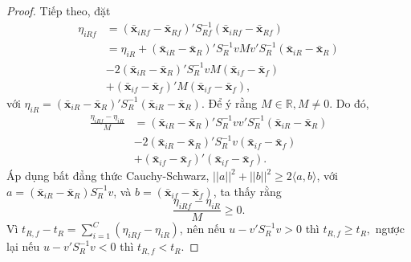 \begin{proof}
	Tiếp theo, đặt
	\begin{align*}
		\eta_{iRf} &= (\bar{\boldsymbol{x}} _{iRf}-\bar{\boldsymbol{x}}_{Rf})'S_{Rf}^{-1}(\bar{\boldsymbol{x}} _{iRf}-\bar{\boldsymbol{x}}_{Rf})\\
		&= \eta_{iR}+(\bar{\boldsymbol{x}}_{iR}-\bar{\boldsymbol{x}}_R)'S_R^{-1}vMv'S_R^{-1}(\bar{\boldsymbol{x}}_{iR}-\bar{\boldsymbol{x}}_R)\\
		& - 2(\bar{\boldsymbol{x}}_{iR}-\bar{\boldsymbol{x}}_R)'S_R^{-1}vM(\bar{\boldsymbol{x}}_{if}-\bar{\boldsymbol{x}}_f)\\
		&+ (\bar{\boldsymbol{x}}_{if}-\bar{\boldsymbol{x}}_f)'M(\bar{\boldsymbol{x}}_{if}-\bar{\boldsymbol{x}}_f),
	\end{align*}
	với  
	$\eta_{iR} = (\bar{\boldsymbol{x}} _{iR}-\bar{\boldsymbol{x}}_{R})'S_{R}^{-1}(\bar{\boldsymbol{x}} _{iR}-\bar{\boldsymbol{x}}_{R})$. Để ý rằng $ M\in \mathbb{R}, M\neq 0$. Do đó,
	\begin{align*}
		\frac{\eta_{iRf}-\eta_{iR}}{M}     &=
		(\bar{\boldsymbol{x}}_{iR}-\bar{\boldsymbol{x}}_R)'S_R^{-1}vv'S_R^{-1}(\bar{\boldsymbol{x}}_{iR}-\bar{\boldsymbol{x}}_R)\\
		& - 2(\bar{\boldsymbol{x}}_{iR}-\bar{\boldsymbol{x}}_R)'S_R^{-1}v(\bar{\boldsymbol{x}}_{if}-\bar{\boldsymbol{x}}_f)\\
		&+ (\bar{\boldsymbol{x}}_{if}-\bar{\boldsymbol{x}}_f)'(\bar{\boldsymbol{x}}_{if}-\bar{\boldsymbol{x}}_f).
	\end{align*}
	Áp dụng bất đẳng thức Cauchy-Schwarz, $||a||^2+||b||^2\ge 2 \langle a,b\rangle$, với  $a = (\bar{\boldsymbol{x}}_{iR}-\bar{\boldsymbol{x}}_R)S_R^{-1}v$, và $b = (\bar{\boldsymbol{x}}_{if}-\bar{\boldsymbol{x}}_f)$, ta thấy rằng
	\begin{equation*}
		\frac{\eta_{iRf}-\eta_{iR}}{M} \ge 0.
	\end{equation*}
	Vì $
	t_{R,f} - t_{R} = \sum_{i=1}^C (\eta_{iRf}- \eta_{iR})$, nên nếu $u - v'S_R^{-1}v>0$ thì $t_{R,f}\ge t_R,$ ngược lại nếu $u - v'S_R^{-1}v<0$ thì $t_{R,f}< t_R.$
\end{proof}

